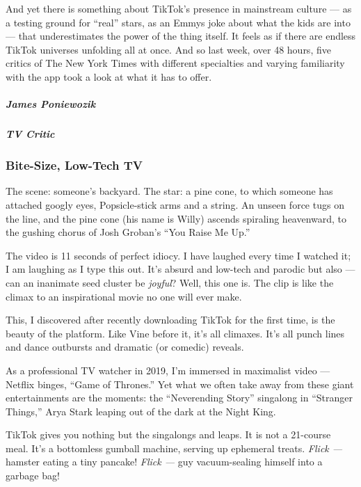 And yet there is something about TikTok's presence in mainstream culture
--- as a testing ground for ``real'' stars, as an Emmys joke about what
the kids are into --- that underestimates the power of the thing itself.
It feels as if there are endless TikTok universes unfolding all at once.
And so last week, over 48 hours, five critics of The New York Times with
different specialties and varying familiarity with the app took a look
at what it has to offer.

\hypertarget{james-poniewozik}{%
\subparagraph{James Poniewozik}\label{james-poniewozik}}

\hypertarget{tv-critic}{%
\subparagraph{TV Critic}\label{tv-critic}}

\hypertarget{bite-size-low-tech-tv}{%
\subsubsection{Bite-Size, Low-Tech TV}\label{bite-size-low-tech-tv}}

The scene: someone's backyard. The star: a pine cone, to which someone
has attached googly eyes, Popsicle-stick arms and a string. An unseen
force tugs on the line, and the pine cone (his name is Willy) ascends
spiraling heavenward, to the gushing chorus of Josh Groban's ``You Raise
Me Up.''

The video is 11 seconds of perfect idiocy. I have laughed every time I
watched it; I am laughing as I type this out. It's absurd and low-tech
and parodic but also --- can an inanimate seed cluster be \emph{joyful}?
Well, this one is. The clip is like the climax to an inspirational movie
no one will ever make.

This, I discovered after recently downloading TikTok for the first time,
is the beauty of the platform. Like Vine before it, it's all climaxes.
It's all punch lines and dance outbursts and dramatic (or comedic)
reveals.

As a professional TV watcher in 2019, I'm immersed in maximalist video
--- Netflix binges, ``Game of Thrones.'' Yet what we often take away
from these giant entertainments are the moments: the ``Neverending
Story'' singalong in ``Stranger Things,'' Arya Stark leaping out of the
dark at the Night King.

TikTok gives you nothing but the singalongs and leaps. It is not a
21-course meal. It's a bottomless gumball machine, serving up ephemeral
treats. \emph{Flick ---} hamster eating a tiny pancake! \emph{Flick ---}
guy vacuum-sealing himself into a garbage bag!

